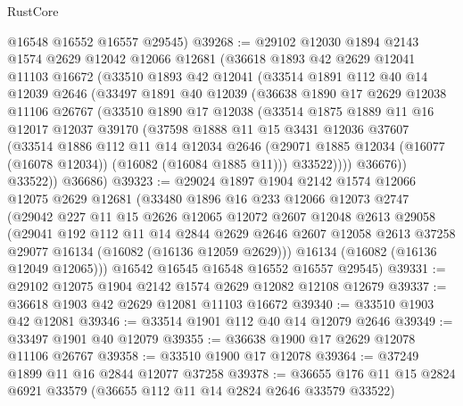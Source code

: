 \begin{lexlean}{RustCore}
\begin{coremodule}
      @16548
      @16552
      @16557
      @29545)
@39268 := @29102
    @12030
    @1894
    @2143
    @1574
    @2629
    @12042
    @12066
    @12681
    (@36618
      @1893
      @42
      @2629
      @12041
      @11103
      @16672
      (@33510
        @1893
        @42
        @12041
        (@33514
          @1891
          @112
          @40
          @14
          @12039
          @2646
          (@33497
            @1891
            @40
            @12039
            (@36638
              @1890
              @17
              @2629
              @12038
              @11106
              @26767
              (@33510
                @1890
                @17
                @12038
                (@33514
                  @1875
                  @1889
                  @11
                  @16
                  @12017
                  @12037
                  @39170
                  (@37598
                    @1888
                    @11
                    @15
                    @3431
                    @12036
                    @37607
                    (@33514
                      @1886
                      @112
                      @11
                      @14
                      @12034
                      @2646
                      (@29071 @1885 @12034 (@16077 (@16078 @12034)) (@16082 (@16084 @1885 @11)))
                      @33522))))
              @36676))
          @33522))
      @36686)
@39323 := @29024
    @1897
    @1904
    @2142
    @1574
    @12066
    @12075
    @2629
    @12681
    (@33480
      @1896
      @16
      @233
      @12066
      @12073
      @2747
      (@29042
        @227
        @11
        @15
        @2626
        @12065
        @12072
        @2607
        @12048
        @2613
        @29058
        (@29041
          @192
          @112
          @11
          @14
          @2844
          @2629
          @2646
          @2607
          @12058
          @2613
          @37258
          @29077
          @16134
          (@16082 (@16136 @12059 @2629)))
        @16134
        (@16082 (@16136 @12049 @12065)))
      @16542
      @16545
      @16548
      @16552
      @16557
      @29545)
@39331 := @29102 @12075 @1904 @2142 @1574 @2629 @12082 @12108 @12679
@39337 := @36618 @1903 @42 @2629 @12081 @11103 @16672
@39340 := @33510 @1903 @42 @12081
@39346 := @33514 @1901 @112 @40 @14 @12079 @2646
@39349 := @33497 @1901 @40 @12079
@39355 := @36638 @1900 @17 @2629 @12078 @11106 @26767
@39358 := @33510 @1900 @17 @12078
@39364 := @37249 @1899 @11 @16 @2844 @12077 @37258
@39378 := @36655 @176 @11 @15 @2824 @6921 @33579 (@36655 @112 @11 @14 @2824 @2646 @33579 @33522)

\end{coremodule}
\end{lexlean}
